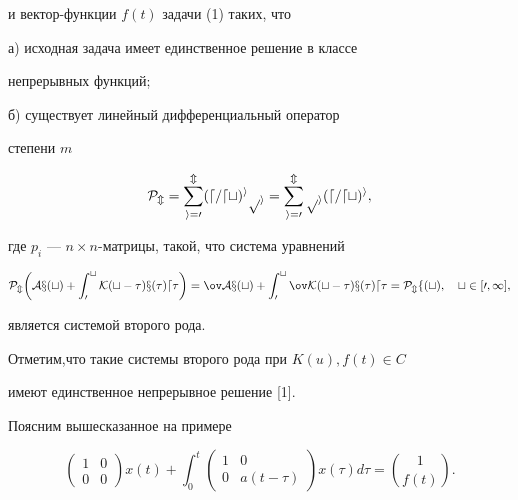 и вектор-функции $f(t)$ задачи (1) таких, что 


 


а) исходная задача имеет единственное решение в классе 


непрерывных функций; 


 


б) существует линейный дифференциальный оператор 


степени $m$ 


\begin{equation} 


\cal P_m=\sum^m_{i=0}(d/dt)^i p_i=\sum^m_{i=0} 


p_i(d/dt)^i, 


\end{equation} 


где $p_i$ --- $n\times n$-матрицы, такой, что система уравнений 


\begin{equation} 


\cal P_m\bigg(Ax(t)+\int^t_0 K(t-\tau)x(\tau)d\tau\bigg)= 


\ov Ax(t)+\int^t_0\ov K(t-\tau)x(\tau)d\tau=\cal P_m f(t), 


\quad t\in[0,1], 


\end{equation} 


является системой второго рода. 


 


Отметим,что такие системы второго рода при $K(u),f(t)\in C$ 


имеют единственное непрерывное решение [1]. 


Поясним вышесказанное на примере 


\begin{equation} 


\begin{pmatrix} 1 & 0 \\ 0 & 0 \end{pmatrix}x(t)+ 


\int^t_0\begin{pmatrix}1 & 0 \\ 0 & a(t-\tau)\end{pmatrix} 


x(\tau)d\tau=\binom{1}{f(t)}. 


\end{equation} 


